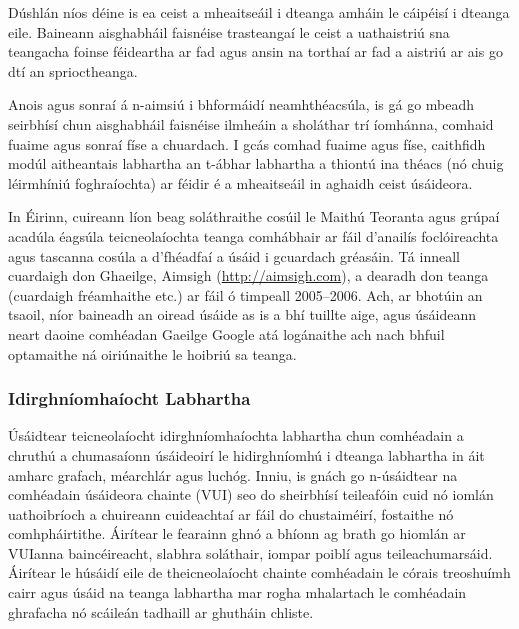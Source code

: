\begin{multicols}{2}

Dúshlán níos déine is ea ceist a mheaitseáil i dteanga amháin le cáipéisí i dteanga eile. Baineann aisghabháil faisnéise trasteangaí  le ceist a uathaistriú sna teangacha foinse féideartha ar fad agus ansin na torthaí ar fad a aistriú ar ais go dtí an sprioctheanga. 

Anois agus sonraí á n-aimsiú i bhformáidí neamhthéacsúla, is gá go mbeadh seirbhísí chun aisghabháil faisnéise ilmheáin a sholáthar trí íomhánna, comhaid fuaime agus sonraí físe a chuardach. I gcás comhad fuaime agus físe, caithfidh modúl aitheantais labhartha an t-ábhar labhartha a thiontú ina théacs (nó chuig léirmhíniú foghraíochta) ar féidir é a mheaitseáil in aghaidh ceist úsáideora.

 In Éirinn, cuireann líon beag soláthraithe cosúil le Maithú Teoranta agus grúpaí acadúla éagsúla teicneolaíochta teanga comhábhair ar fáil d’anailís foclóireachta agus tascanna cosúla a d’fhéadfaí a úsáid i gcuardach gréasáin. Tá inneall cuardaigh don Ghaeilge, Aimsigh (\url{http://aimsigh.com}), a dearadh don teanga (cuardaigh fréamhaithe etc.) ar fáil ó timpeall 2005--2006. Ach, ar bhotúin an tsaoil, níor baineadh an oiread úsáide as is a bhí tuillte aige, agus úsáideann neart daoine comhéadan Gaeilge Google atá logánaithe ach nach bhfuil optamaithe ná oiriúnaithe le hoibriú sa teanga.
  
\subsubsection{Idirghníomhaíocht Labhartha}

Úsáidtear teicneolaíocht idirghníomhaíochta labhartha chun comhéadain a chruthú a chumasaíonn úsáideoirí le hidirghníomhú i dteanga labhartha in áit amharc grafach, méarchlár agus luchóg. Inniu, is gnách go n-úsáidtear na comhéadain úsáideora chainte (VUI) seo do sheirbhísí teileafóin cuid nó iomlán uathoibríoch a chuireann cuideachtaí ar fáil do chustaiméirí, fostaithe nó comhpháirtithe. Áirítear le fearainn ghnó a bhíonn ag brath go hiomlán ar VUIanna baincéireacht, slabhra soláthair, iompar poiblí agus teileachumarsáid. Áirítear le húsáidí eile de theicneolaíocht chainte comhéadain le córais treoshuímh cairr agus úsáid na teanga labhartha mar rogha mhalartach le comhéadain ghrafacha nó scáileán tadhaill ar ghutháin chliste.



\end{multicols}
